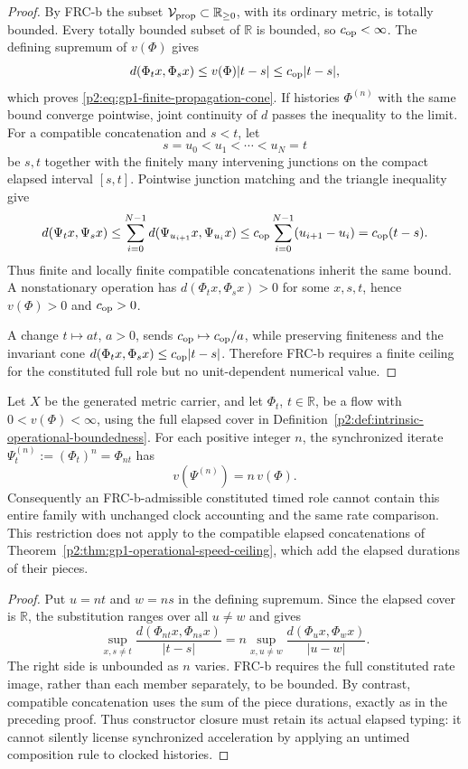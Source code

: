 \documentclass[12pt,a4paper]{article}
\begin{document}
\begin{proof}
By FRC-b the subset
\(\mathcal V_{\rm prop}\subset\mathbb R_{\ge0}\), with its ordinary metric,
is totally bounded.  Every totally bounded subset of \(\mathbb R\) is bounded,
so \(c_{\rm op}<\infty\).  The defining supremum of \(v(\Phi)\) gives
\[
 d(\Phi_t x,\Phi_s x)
 \le v(\Phi)|t-s|
 \le c_{\rm op}|t-s|,
\]
which proves \eqref{p2:eq:gp1-finite-propagation-cone}.  If histories
\(\Phi^{(n)}\) with the same bound converge pointwise, joint continuity of \(d\)
passes the inequality to the limit.  For a compatible concatenation and
\(s<t\), let
\[
 s=u_0<u_1<\cdots<u_N=t
\]
be \(s,t\) together with the finitely many intervening junctions on the
compact elapsed interval \([s,t]\).
Pointwise junction matching and the triangle inequality give
\[
 d(\Psi_t x,\Psi_s x)
 \le \sum_{i=0}^{N-1}d(\Psi_{u_{i+1}}x,\Psi_{u_i}x)
 \le c_{\rm op}\sum_{i=0}^{N-1}(u_{i+1}-u_i)
 =c_{\rm op}(t-s).
\]
Thus finite and locally finite compatible concatenations inherit the same
bound.  A nonstationary operation has
\(d(\Phi_t x,\Phi_s x)>0\) for some \(x,s,t\), hence \(v(\Phi)>0\) and
\(c_{\rm op}>0\).

A change
\(t\mapsto at\), \(a>0\), sends
\(c_{\rm op}\mapsto c_{\rm op}/a\), while preserving
finiteness and the invariant cone
\(d(\Phi_tx,\Phi_sx)\le c_{\rm op}|t-s|\).  Therefore FRC-b requires a finite ceiling for
the constituted full role
but no unit-dependent numerical value.
\end{proof}

\begin{proposition}
\label{p2a:prop:clocked-composition-rate-scope}
Let $X$ be the generated metric carrier, and let
$\Phi_t$, $t\in\mathbb R$, be a flow with
$0<v(\Phi)<\infty$, using the full elapsed cover in
Definition~\ref{p2:def:intrinsic-operational-boundedness}.  For each positive
integer $n$, the synchronized iterate
$\Psi^{(n)}_t:=(\Phi_t)^n=\Phi_{nt}$ has
\[
 v(\Psi^{(n)})=n\,v(\Phi).
\]
Consequently an FRC-b-admissible constituted timed role cannot contain this
entire family with unchanged clock accounting and the same rate comparison.
This restriction does not apply to the compatible elapsed concatenations of
Theorem~\ref{p2:thm:gp1-operational-speed-ceiling}, which add the elapsed
durations of their pieces.
\end{proposition}

\begin{proof}
Put $u=nt$ and $w=ns$ in the defining supremum.  Since the elapsed cover is
$\mathbb R$, the substitution ranges over all $u\ne w$ and gives
\[
 \sup_{x,s\ne t}\frac{d(\Phi_{nt}x,\Phi_{ns}x)}{|t-s|}
 =n\sup_{x,u\ne w}\frac{d(\Phi_ux,\Phi_wx)}{|u-w|}.
\]
The right side is unbounded as $n$ varies.  FRC-b requires the full
constituted rate image, rather than each member separately, to be bounded.
By contrast, compatible concatenation uses the sum of the piece durations,
exactly as in the preceding proof.  Thus constructor closure must retain its
actual elapsed typing: it cannot silently license synchronized acceleration
by applying an untimed composition rule to clocked histories.
\end{proof}
\end{document}
